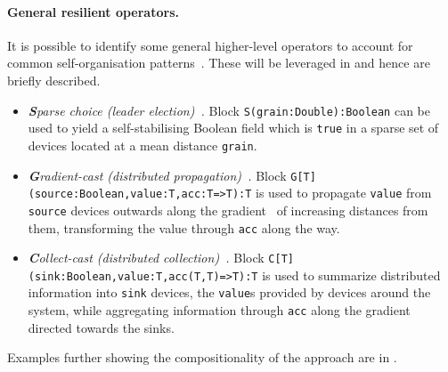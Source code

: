\paragraph*{General resilient operators.}
%
It is possible to identify some general higher-level operators to account for common self-organisation patterns~\cite{DBLP:journals/tomacs/ViroliABDP18}. These will be leveraged in  and hence are briefly described.
%
\begin{itemize}
\item \emph{\textbf{S}parse choice (leader election)~\cite{DBLP:conf/acsos/PianiniCV22}.} Block \lstinline|S(grain:Double):Boolean| can be used to yield a self-stabilising Boolean field which is \lstinline|true| in a sparse set of devices located at a mean distance \lstinline|grain|.

\item \emph{\textbf{G}radient-cast (distributed propagation)~\cite{DBLP:journals/tomacs/ViroliABDP18}.}
Block \lstinline|G[T](source:Boolean,value:T,acc:T=>T):T| is used to propagate \lstinline|value| from \lstinline|source| devices outwards along the gradient~\cite{DBLP:journals/tomacs/ViroliABDP18} of increasing distances from them, transforming the value through \lstinline|acc| along the way.

\item \emph{\textbf{C}ollect-cast (distributed collection)~\cite{DBLP:journals/cee/AudritoCDPV21}.} Block \lstinline|C[T](sink:Boolean,value:T,acc(T,T)=>T):T| is used to summarize distributed information into \lstinline|sink| devices, the \lstinline|value|s provided by devices around the system, while aggregating information through \lstinline|acc| along the gradient directed towards the sinks.
\end{itemize}
%
Examples further showing the compositionality of the approach are in .



%


